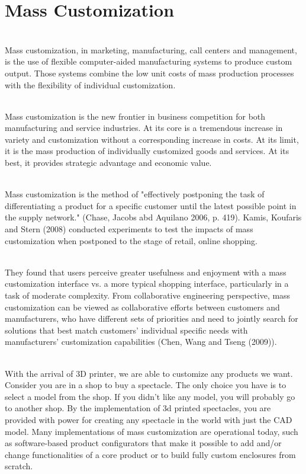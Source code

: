 \documentclass[12pt,a4paper]{report}
\begin{document}
	\section{Mass Customization}
	
	\indent
	\\Mass customization, in marketing, manufacturing, call centers and management, is the use of
	flexible computer-aided manufacturing systems to produce custom output. Those systems combine
	the low unit costs of mass production processes with the flexibility of individual customization.\par
	\indent
	\\Mass customization is the new frontier in business competition for both manufacturing and
	service industries. At its core is a tremendous increase in variety and customization without a
	corresponding increase in costs. At its limit, it is the mass production of individually customized
	goods and services. At its best, it provides strategic advantage and economic value.\par
	\indent
	\\Mass customization is the method of "effectively postponing the task of differentiating a
	product for a specific customer until the latest possible point in the supply network." (Chase, Jacobs
	abd Aquilano 2006, p. 419). Kamis, Koufaris and Stern (2008) conducted experiments to test the
	impacts of mass customization when postponed to the stage of retail, online shopping.\par
	\indent
	\\They found that users perceive greater usefulness and enjoyment with a mass customization
	interface vs. a more typical shopping interface, particularly in a task of moderate complexity.
	From collaborative engineering perspective, mass customization can be viewed as
	collaborative efforts between customers and manufacturers, who have different sets of priorities and
	need to jointly search for solutions that best match customers’ individual specific needs with
	manufacturers’ customization capabilities (Chen, Wang and Tseng (2009)).\par
	\indent
	\\With the arrival of 3D printer, we are able to customize any products we want. Consider you
	are in a shop to buy a spectacle. The only choice you have is to select a model from the shop. If you
	didn’t like any model, you will probably go to another shop. By the implementation of 3d printed
	spectacles, you are provided with power for creating any spectacle in the world with just the CAD
	model. Many implementations of mass customization are operational today, such as software-based
	product configurators that make it possible to add and/or change functionalities of a core product or
	to build fully custom enclosures from scratch.\par
\end{document}
